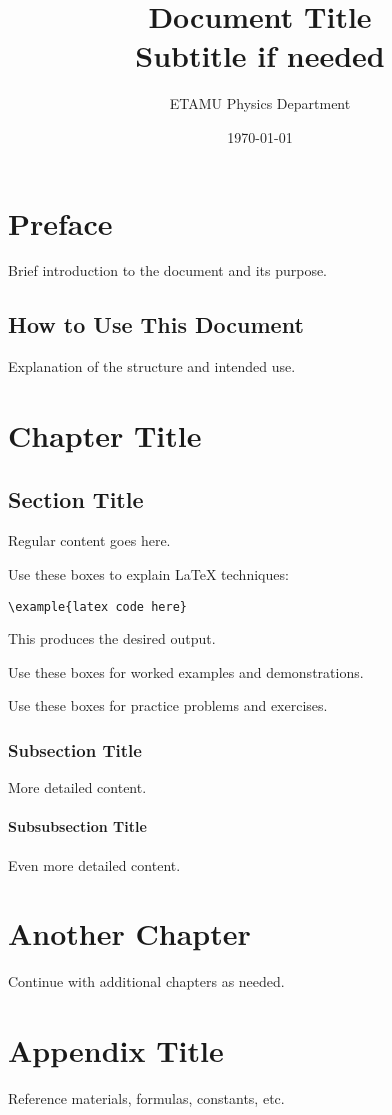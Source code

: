 \documentclass[11pt]{book}
\title{Document Title\\Subtitle if needed}
\author{ETAMU Physics Department}
\date{\today}
\begin{document}
\frontmatter
\maketitle

\tableofcontents
\listoffigures

\chapter{Preface}

Brief introduction to the document and its purpose.

\section{How to Use This Document}

Explanation of the structure and intended use.

\mainmatter

\chapter{Chapter Title}

\section{Section Title}

Regular content goes here.

\begin{tutorialbox}[title=LaTeX Tutorial Title]
Use these boxes to explain LaTeX techniques:
\begin{verbatim}
\example{latex code here}
\end{verbatim}
This produces the desired output.
\end{tutorialbox}

\begin{examplebox}[title=Example Title]
Use these boxes for worked examples and demonstrations.
\end{examplebox}

\begin{problembox}[title=Problem Title]
Use these boxes for practice problems and exercises.
\end{problembox}

\subsection{Subsection Title}

More detailed content.

\subsubsection{Subsubsection Title}

Even more detailed content.

\chapter{Another Chapter}

Continue with additional chapters as needed.

\backmatter

\appendix

\chapter{Appendix Title}

Reference materials, formulas, constants, etc.
\end{document}
